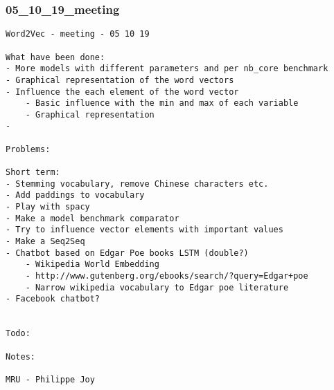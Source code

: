 \newpage
\subsubsection{05\_10\_19\_meeting}
\begin{lstlisting}
Word2Vec - meeting - 05 10 19

What have been done:
- More models with different parameters and per nb_core benchmark
- Graphical representation of the word vectors
- Influence the each element of the word vector
    - Basic influence with the min and max of each variable
    - Graphical representation
- 

Problems:

Short term:
- Stemming vocabulary, remove Chinese characters etc.
- Add paddings to vocabulary
- Play with spacy
- Make a model benchmark comparator
- Try to influence vector elements with important values
- Make a Seq2Seq
- Chatbot based on Edgar Poe books LSTM (double?)
    - Wikipedia World Embedding
    - http://www.gutenberg.org/ebooks/search/?query=Edgar+poe
    - Narrow wikipedia vocabulary to Edgar poe literature
- Facebook chatbot?


Todo:

Notes:

MRU - Philippe Joy
\end{lstlisting}